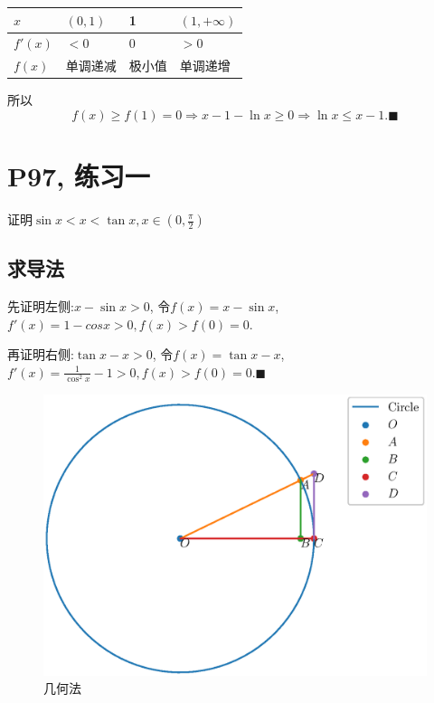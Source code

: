 \documentclass{book}
\begin{document}
    \begin{table}[htbp]
        \centering
        \begin{tabular}{|l|l|l|l|}
        \hline
        $x$     & $(0,1)$ & 1   & $(1,+\infty)$ \\ \hline
        $f'(x)$ & $<0$    & 0   & $>0$          \\ \hline
        $f(x)$  & 单调递减    & 极小值 & 单调递增          \\ \hline
        \end{tabular}
        \end{table}

    所以$$f(x)\ge f(1)=0\Longrightarrow x-1-\ln x\ge 0\Longrightarrow \ln x\le x-1.\blacksquare$$

    \section{\textcolor[rgb]{0.11,0.65,0.52}{P97, 练习一}}

    \begin{boxB}
        证明$\displaystyle \sin x<x<\tan x,x\in\left( 0,\frac{\pi}{2} \right)$
    \end{boxB}

    \subsection{求导法}

    先证明左侧:$x-\sin x>0$, 令$f(x)=x-\sin x$, $f'(x)=1-cos x>0,f(x)>f(0)=0$.

    再证明右侧:$\tan x-x>0$, 令$f(x)=\tan x-x$, $\displaystyle f'(x)=\frac{1}{\cos^2x}-1>0,f(x)>f(0)=0$.$\blacksquare$

    \begin{figure}[htbp] 
        \centering
        \includegraphics[width=\textwidth]{img/CircleSinTan.eps}
        \caption{几何法}
    \end{figure}
\end{document}
